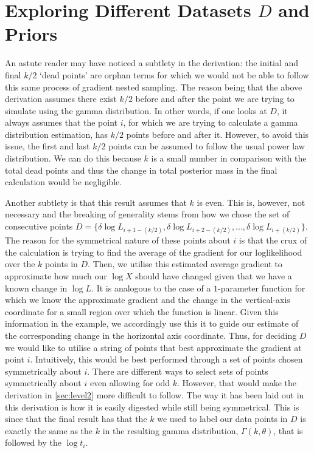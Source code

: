 \section{Exploring Different Datasets $D$ and Priors}\label{sec:exploring}
An astute reader may have noticed a subtlety in the derivation: the initial and final $k/2$ `dead points' are orphan terms for which we would not be able to follow this same process of gradient nested sampling. The reason being that the above derivation assumes there exist $k/2$ before and after the point we are trying to simulate using the gamma distribution. In other words, if one looks at $D$, it always assumes that the point $i$, for which we are trying to calculate a gamma distribution estimation, has $k/2$ points before and after it. However, to avoid this issue, the first and last $k/2$ points can be assumed to follow the usual power law distribution. We can do this because $k$ is a small number in comparison with the total dead points and thus the change in total posterior mass in the final calculation would be negligible. 

Another subtlety is that this result assumes that $k$ is even. This is, however, not necessary and the breaking of generality stems from how we chose the set of consecutive points $D= \{ \delta \log L_{i+1-(k/2)},\delta \log L_{i+2-(k/2)},...,\delta \log L_{i+(k/2)} \}$. The reason for the symmetrical nature of these points about $i$ is that the crux of the calculation is trying to find the average of the gradient for our loglikelihood over the $k$ points in $D$. Then, we utilise this estimated average gradient to approximate how much our $\log X$ should have changed given that we have a known change in $\log L$. It is analogous to the case of a $1$-parameter function for which we know the approximate gradient and the change in the vertical-axis coordinate for a small region over which the function is linear. Given this information in the example, we accordingly use this it to guide our estimate of the corresponding change in the horizontal axis coordinate. Thus, for deciding $D$ we would like to utilise a string of points that best approximate the gradient at point $i$. Intuitively, this would be best performed through a set of points chosen symmetrically about $i$. There are different ways to select sets of points symmetrically about $i$ even allowing for odd $k$. However, that would make the derivation in \cref{sec:level2} more difficult to follow. The way it has been laid out in this derivation is how it is easily digested while still being symmetrical. This is since that the final result has that the $k$ we used to label our data points in $D$ is exactly the same as the $k$ in the resulting gamma distribution, $\Gamma (k,\theta)$, that is followed by the $\log t_i$. 

